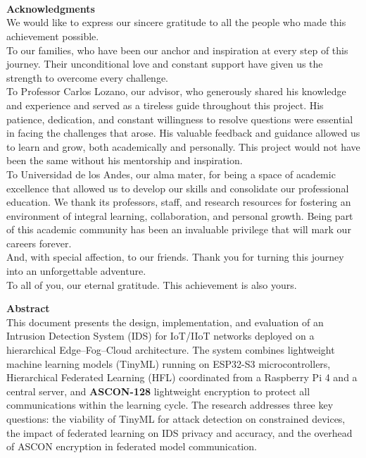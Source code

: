 \newpage{\pagestyle{empty}\cleardoublepage}

\newpage
\thispagestyle{empty} \textbf{}\normalsize
\\\\\\%
\textbf{Acknowledgments}\\[4.0cm]



        We would like to express our sincere gratitude to all the people who made this achievement possible.\\

        To our families, who have been our anchor and inspiration at every step of this journey. Their unconditional love and constant support have given us the strength to overcome every challenge. \\
        
        To Professor Carlos Lozano, our advisor, who generously shared his knowledge and experience and served as a tireless guide throughout this project. His patience, dedication, and constant willingness to resolve questions were essential in facing the challenges that arose. His valuable feedback and guidance allowed us to learn and grow, both academically and personally. This project would not have been the same without his mentorship and inspiration. \\

        To Universidad de los Andes, our alma mater, for being a space of academic excellence that allowed us to develop our skills and consolidate our professional education. We thank its professors, staff, and research resources for fostering an environment of integral learning, collaboration, and personal growth. Being part of this academic community has been an invaluable privilege that will mark our careers forever. \\
        
        And, with special affection, to our friends. Thank you for turning this journey into an unforgettable adventure.\\
        
        To all of you, our eternal gratitude. This achievement is also yours.
        



\newpage{\pagestyle{empty}\cleardoublepage}




\textbf{\LARGE Abstract}\\

This document presents the design, implementation, and evaluation of an Intrusion Detection System (IDS) for IoT/IIoT networks deployed on a hierarchical Edge--Fog--Cloud architecture. The system combines lightweight machine learning models (TinyML) running on ESP32-S3 microcontrollers, Hierarchical Federated Learning (HFL) coordinated from a Raspberry Pi 4 and a central server, and \textbf{ASCON-128} lightweight encryption to protect all communications within the learning cycle. The research addresses three key questions: the viability of TinyML for attack detection on constrained devices, the impact of federated learning on IDS privacy and accuracy, and the overhead of ASCON encryption in federated model communication.\\

